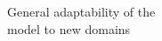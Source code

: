 \documentclass[preview]{standalone}
\begin{document}
General adaptability of the \\model to new domains\\
\end{document}
